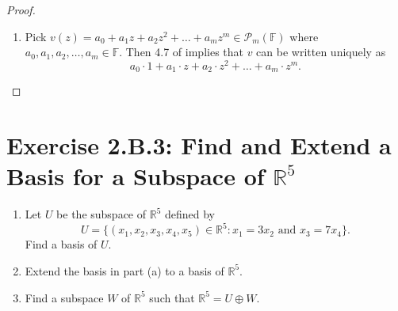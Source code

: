 \begin{proof}
\begin{enumerate}[label=(\alph*)]
Note that the above linear system is an overdetermined system, so it has either no solutions or a unique solution. Moreover, it can be shown that \[
\begin{bmatrix}-b\\
a+b\end{bmatrix}
\] is one possible solution. Therefore every $v\in V$ can be written uniquely using $(1,-1,0),(1,0,-1)$.
\item Pick $v(z)=a_0+a_1z+a_2z^2+\dots+a_mz^m\in\mathcal{P}_m(\mathbb{F})$ where $a_0,a_1,a_2,\dots,a_m\in\mathbb{F}$. Then 4.7 of \cite{axler2014linear} implies that $v$ can be written uniquely as\[
a_0\cdot 1+a_1\cdot z+a_2\cdot z^2+\dots+a_m\cdot z^m.
\]
\end{enumerate}
\end{proof}

\section{Exercise 2.B.3: Find and Extend a Basis for a Subspace of $\mathbb{R}^5$}
\begin{enumerate}[label=(\alph*)]
\item Let $U$ be the subspace of $\mathbb{R}^5$ defined by\[
U=\{(x_1,x_2,x_3,x_4,x_5)\in\mathbb{R}^5:x_1=3x_2\text{ and }x_3=7x_4\}.
\]
Find a basis of $U$.
\item Extend the basis in part (a) to a basis of $\mathbb{R}^5$.
\item Find a subspace $W$ of $\mathbb{R}^5$ such that $\mathbb{R}^5=U\oplus W$.
\end{enumerate}
